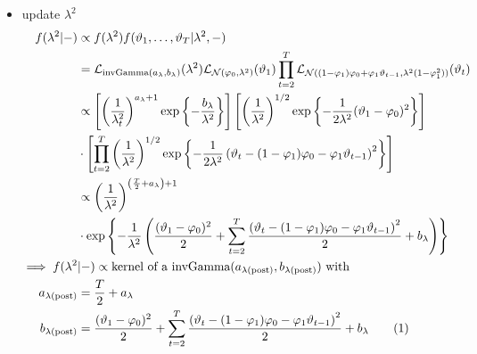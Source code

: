 \documentclass[12pt,	%
	a4paper,		%
	twoside,		%
	openright,		%
	titlepage,%
	]{book}
\theoremstyle{definition}
\begin{document}
\begin{itemize}
\item update $\lambda^2$
\begin{align*}
    f(\lambda^2|-) & \propto  f(\lambda^2) f(\theta_1,\ldots,\theta_T|\lambda^2,-)\\
    & = \law_{\invgamma(a_\lambda,b_\lambda)}(\lambda^2)\law_{\N(\phi_0,\lambda^2)}(\theta_1)\prod_{t=2}^{T} \law_{\N((1-\phi_1)\phi_0 +\phi_1\theta_{t-1},\lambda^2(1-\phi_1^2))}(\theta_t)\\
    &\propto \left[ \left( \frac{1}{\lambda_t^2}\right)^{a_\lambda+1} \expp{-\frac{b_\lambda}{\lambda^2}}\right] \left[ \left(\frac{1}{\lambda^2}\right)^{1/2} \expp{-\frac{1}{2\lambda^2}(\theta_1-\phi_0)^2}\right] \\
    &\cdot \left[ \prod_{t=2}^T \left(\frac{1}{\lambda^2}\right)^{1/2} \expp{-\frac{1}{2\lambda^2}\left( \theta_t - (1-\phi_1)\phi_0 -\phi_1\theta_{t-1}\right)^2} \right]\\
    & \propto \left( \frac{1}{\lambda^2}\right)^{\left( \frac{T}{2}+a_\lambda\right)+1}\\& \cdot\expp{-\frac{1}{\lambda^2}\left( \frac{(\theta_1-\phi_0)^2}{2}
 + \sum_{t=2}^T \frac{\left( \theta_t - (1-\phi_1)\phi_0 -\phi_1\theta_{t-1}\right)^2}{2}+b_\lambda\right)}\\
    \implies f(\lambda^2&|-)\propto \text{kernel of a $\invgamma(a_{\postp{\lambda}}, b_{\postp{\lambda}})$ with}\\
a_{\postp{\lambda}}&=\frac{T}{2}+a_\lambda\\
%
b_{\postp{\lambda}}&=  \frac{(\theta_1-\phi_0)^2}{2}
 + \sum_{t=2}^T \frac{\left( \theta_t - (1-\phi_1)\phi_0 -\phi_1\theta_{t-1}\right)^2}{2}+b_\lambda
 \tag{\stepcounter{equation}\theequation}
\end{align*}


\end{itemize}
\end{document}
